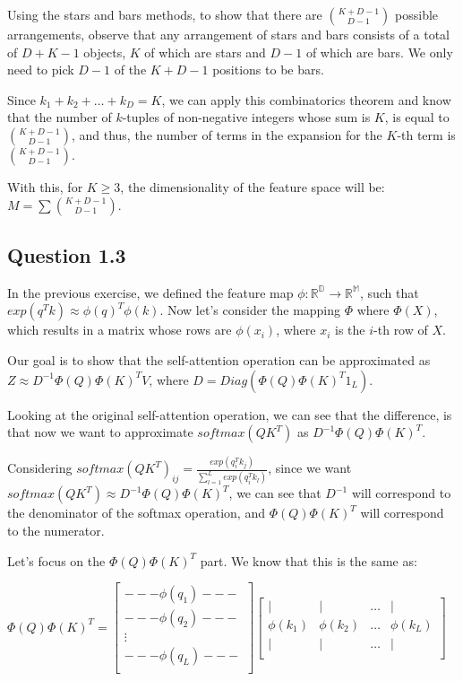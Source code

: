 \documentclass{article}
\begin{document}
Using the stars and bars methods, to show that there are $\binom{K + D -1}{D - 1}$ possible arrangements, observe that any arrangement of stars and bars consists of a 
total of $D + K - 1$ objects, $K$ of which are stars and $D - 1$ of which are bars. We only need to pick $D - 1$ of the $K + D - 1$ 
positions to be bars. 

Since $k_1 + k_2 + \dots + k_D = K$, we can apply this combinatorics theorem and know that the number of $k$-tuples of non-negative integers whose sum is $K$, is equal to
$\binom{K + D - 1}{D - 1}$, and thus, the number of terms in the expansion for the $K$-th term is $\binom{K + D - 1}{D - 1}$.

\bigskip

With this, for $K \geq 3$, the dimensionality of the feature space will be: $M = \sum \binom{K + D - 1}{D - 1}$.

\subsection{Question 1.3}

In the previous exercise, we defined the feature map $\phi: \mathbb{R^D} \rightarrow \mathbb{R^M}$, such that $exp(q^Tk) \approx \phi(q)^T\phi(k)$. 
Now let's consider the mapping $\Phi$ where $\Phi(X)$, which results in a matrix whose rows are $\phi(x_i)$, where $x_i$ is the $i$-th row of $X$.

Our goal is to show that the self-attention operation can be approximated as $Z \approx D^{-1}\Phi(Q) \Phi(K)^T V$, 
where $D = Diag(\Phi(Q) \Phi(K)^T 1_L)$. 

Looking at the original self-attention operation, we can see that the difference, is that now we want to approximate
$softmax(QK^T)$ as $D^{-1}\Phi(Q) \Phi(K)^T$.

Considering $softmax(QK^T)_{ij} = \frac{exp(q_i^Tk_j)}{\sum_{l=1}^L exp(q_i^Tk_l)}$, since we want
$softmax(QK^T) \approx D^{-1}\Phi(Q) \Phi(K)^T$, we can see that $D^{-1}$ will correspond to the denominator of the softmax operation,
and $\Phi(Q) \Phi(K)^T$ will correspond to the numerator.

\bigskip

Let's focus on the $\Phi(Q) \Phi(K)^T$ part. We know that this is the same as:

\medskip

$
    \Phi(Q) \Phi(K)^T = 
    \begin{bmatrix}
        --- \phi(q_1) --- \\
        --- \phi(q_2) --- \\
        \vdots \\
        --- \phi(q_L) --- \\
    \end{bmatrix}
    \begin{bmatrix}
        | & | & \dots & | \\
        \phi(k_1) & \phi(k_2) & \dots & \phi(k_L) \\
        | & | & \dots & | \\
    \end{bmatrix}
$
\end{document}
